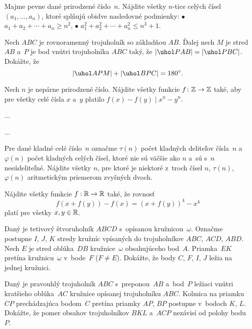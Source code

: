 {%
Majme pevne dané prirodzené číslo~$n$. Nájdite všetky $n$-tice celých čísel $ (a_1,\dots,a_n)$, ktoré splňujú obidve nasledovné podmienky:
\ite $\bullet$ $a_1 + a_2 + \cdots + a_n \ge n^2$,
\ite $\bullet$ $a_1^2 + a_2^2 + \cdots + a_n^2 \le n^3 + 1$.
}

{%
Nech $ABC$ je rovnoramenný trojuholník so základňou $AB$. Ďalej nech $M$ je stred $AB$ a~$P$ je bod vnútri trojuholníka $ABC$ taký, že $|\uhol PAB| = |\uhol PBC|$. Dokážte, že
$$
|\uhol APM| + |\uhol BPC| = 180^{\circ}.
$$}

{%
Nech  $n$ je nepárne prirodzené číslo. Nájdite všetky funkcie $f\colon\Bbb Z \to \Bbb Z$ také, aby pre všetky celé čísla $x$ a~$y$ platilo $f(x) - f(y) \mid x^n - y^n$.
}

{%
...}

{%
...}

{%
Pre dané kladné celé číslo~$n$ označme $\tau(n)$ počet kladných deliteľov čísla~$n$ a~$\varphi(n)$ počet kladných celých čísel, ktoré nie sú väčšie ako $n$ a~sú s~$n$ nesúdeliteľné.  Nájdite všetky $n$, pre ktoré je niektoré z~troch čísel $n$, $\tau(n)$, $\varphi(n)$ aritmetickým priemerom zvyšných dvoch.}

{%
Nájdite všetky funkcie $f:\Bbb R\to \Bbb R$ také, že rovnosť
$$
f(x+f(y))-f(x)=(x+f(y))^4-x^4
$$
platí pre všetky $x,y\in\Bbb R$.}

{%
Daný je tetivový štvoruholník $ABCD$ s~opísanou kružnicou~$\omega$. Označme postupne $I$, $J$, $K$ stredy kružníc vpísaných do trojuholníkov $ABC$, $ACD$, $ABD$. Nech $E$ je stred oblúka~$DB$ kružnice~$\omega$ obsahujúceho bod~$A$. Priamka~$EK$ pretína kružnicu~$\omega$ v~bode~$F$ ($F\ne E$). Dokážte, že body $C$, $F$, $I$, $J$ ležia na jednej kružnici.}

{%
Daný je pravouhlý trojuholník $ABC$ s~preponou~$AB$ a~bod~$P$ ležiaci vnútri kratšieho oblúka~$AC$ kružnice opísanej trojuholníku $ABC$. Kolmica na priamku~$CP$ prechádzajúca bodom~$C$ pretína priamky $AP$, $BP$ postupne v~bodoch $K$, $L$. Dokážte, že pomer obsahov trojuholníkov $BKL$ a~$ACP$ nezávisí od polohy bodu~$P$.}

